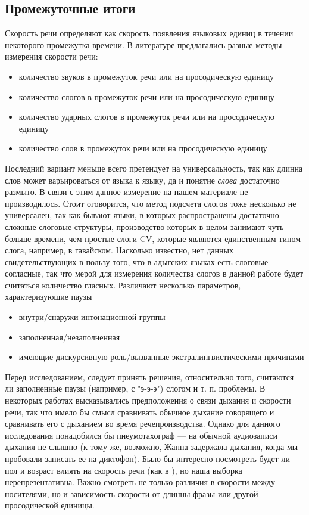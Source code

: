 \subsection{Промежуточные итоги}
\begin{itemize}
\mytem Скорость речи определяют как скорость появления языковых единиц в течении некоторого промежутка времени. В литературе предлагались разные методы измерения скорости речи:
\begin{itemize}
\item количество звуков в промежуток речи или на просодическую единицу
\item количество слогов в промежуток речи или на просодическую единицу
\item количество ударных слогов в промежуток речи или на просодическую единицу
\item количество слов в промежуток речи или на просодическую единицу
\end{itemize}
Последний вариант меньше всего претендует на универсальность, так как длинна слов может варьироваться от языка к языку, да и понятие \textit{слова} достаточно размыто. В связи с этим данное измерение на нашем материале не производилось. Стоит оговорится, что метод подсчета слогов тоже несколько не универсален, так как бывают языки, в которых распространены достаточно сложные слоговые структуры, производство которых в целом занимают чуть больше времени, чем простые слоги CV, которые являются единственным типом слога, например, в гавайском.
\mytem Насколько известно, нет данных свидетельствующих в пользу того, что в адыгских языках есть слоговые согласные, так что мерой для измерения количества слогов в данной работе будет считаться количество гласных.
\mytem Различают несколько параметров, характеризуюшие паузы
\begin{itemize}
\item внутри/снаружи интонационной группы
\item заполненная/незаполненная
\item имеющие дискурсивную роль/вызванные экстралингвистическими причинами
\end{itemize}
Перед исследованием, следует принять решения, относительно того, считаются ли заполненные паузы (например, с "э-э-э") слогом и т. п. проблемы.
\mytem В некоторых работах высказывались предположения о связи дыхания и скорости речи, так что имело бы смысл сравнивать обычное дыхание говорящего и сравнивать его с дыханием во время речепроизводства. Однако для данного исследования понадобился бы пнеумотахограф --- на обычной  аудиозаписи дыхания не слышно (к тому же, возможно, Жанна задержала дыхания, когда мы пробовали записать ее на диктофон).
\mytem Было бы интересно посмотреть будет ли пол и возраст влиять на скорость речи (как в \citep{stepanova11}), но наша выборка нерепрезентативна.
\mytem Важно смотреть не только различия в скорости между носителями, но и зависимость скорости от длинны фразы или другой просодической единицы.
\end{itemize}

